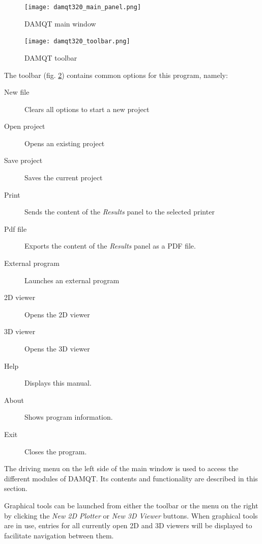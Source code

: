 \documentclass[10pt]{article}
\begin{document}
\vspace*{0cm}
\begin{figure}[H]
\begin{center}
\texttt{[image: damqt320\_main\_panel.png]}
\end{center}
\caption{{DAMQT} main window \label{fig:2_1}}
\end{figure}

\vspace*{0cm}
\begin{figure}[H]
\begin{center}
\texttt{[image: damqt320\_toolbar.png]}
\end{center}
\caption{{DAMQT} toolbar \label{fig:2_2}}
\end{figure}

The toolbar (fig. \ref{fig:2_2}) contains common options for this
program, namely:


\begin{description}
 \item[\bigtoolbN New file] Clears all options to start a new project
 \item[\bigtoolbA Open project] Opens an existing  project
 \item[\bigtoolbS Save project] Saves the current project
 \item[\bigtoolbP Print] Sends the content of the {\it Results} panel to the selected printer
 \item[\bigtoolbD Pdf file] Exports the content of the {\it Results} panel as a PDF file.
 \item[\bigtoolbE External program] Launches an external program
 \item[\bigtoolbC 2D viewer] Opens the  2D viewer
 \item[\bigtoolbV 3D viewer] Opens the  3D viewer
 \item[\bigtoolbH Help] Displays this manual.
 \item[\bigtoolbB About] Shows program information.
 \item[\bigtoolbQ Exit] Closes the program.
\end{description} 

The driving menu on the left side of the main window is used to access the different modules of DAMQT.
Its contents and functionality are described in this section.

Graphical tools can be launched from either the toolbar or the menu on the right
by clicking the {\it New 2D Plotter} or {\it New 3D Viewer} buttons.
When graphical tools are in use, entries for all currently open 2D and 3D viewers
will be displayed to facilitate navigation between them.
\end{document}

